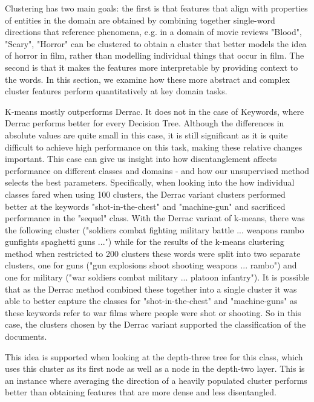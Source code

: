Clustering has two main goals: the first is that features that  align with properties of entities in the domain are obtained by combining together single-word directions that reference phenomena, e.g. in a domain of movie reviews "Blood", "Scary",  "Horror" can be clustered to obtain a cluster that better models the idea of horror in film, rather than modelling individual things that occur in film. The second is that it makes the features more interpretable by providing context to the words. In this section, we examine how these more abstract and complex cluster features perform quantitatively at key domain tasks.

K-means mostly outperforms Derrac. It does not in the case of Keywords, where Derrac performs better for every Decision Tree. Although the differences in absolute values are quite small in this case, it is still significant as it is quite difficult to achieve high performance on this task, making these relative changes important. This case can give us insight into how disentanglement affects performance on different classes and domains - and how our unsupervised method selects the best parameters.  Specifically, when looking into the how individual classes fared when using 100 clusters, the Derrac variant clusters performed better at the keywords "shot-in-the-chest" and "machine-gun" and sacrificed performance in the "sequel" class. With the Derrac variant of k-means, there was the following cluster ("soldiers combat fighting military battle ... weapons rambo gunfights spaghetti guns ...") while for the results of the k-means clustering method when restricted to 200 clusters these words were split into two separate clusters, one for guns ("gun explosions shoot shooting weapons ... rambo") and one for military ("war soldiers combat military ... platoon infantry"). It is possible that as the Derrac method combined these together into a single cluster it was able to better capture the classes for "shot-in-the-chest" and "machine-guns" as these keywords refer to war films where people were shot or shooting. So in this case, the clusters chosen by the  Derrac variant supported the classification of the documents. 

This idea is supported when looking at the depth-three tree for this class, which uses this cluster as its first node as well as a node in the depth-two layer. This is an instance where averaging the direction of  a heavily populated cluster  performs better than obtaining features that are more dense and less disentangled. 


